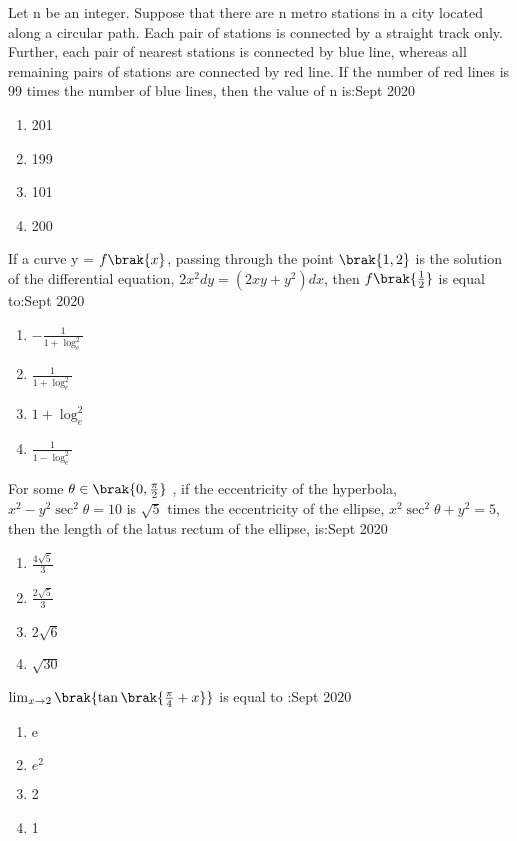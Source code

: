 \iffalse
  \title{Assignment}
  \author{EE24BTECH11038}
  \section{mcq-single}
\fi  
   \item Let n be an integer. Suppose that there are n metro stations in a city located along a circular path. Each pair of stations is connected by a straight track only. Further, each pair of nearest stations is connected by blue line, whereas all remaining pairs of stations are connected by red line. If the number of red lines is 99 times the number of blue lines, then the value of n is:\hfill{Sept 2020}
   \begin{enumerate}
       \item 201
       \item 199
       \item 101
       \item 200
   \end{enumerate}
   \item If a curve y = $f\brak{x}$, passing through the point $\brak{1,2}$ is the solution of the differential equation, $2x^2dy = (2xy+y^2)dx$, then $f\brak{\frac{1}{2}}$ is equal to:\hfill{Sept 2020}
   \begin{enumerate}
       \item $-\frac{1}{1+\log_{e}^{2}}$
       \item $\frac{1}{1+\log_{e}^{2}}$
       \item ${1+\log_{e}^{2}}$
       \item $\frac{1}{1-\log_{e}^{2}}$
   \end{enumerate}
   \item  For some $\theta \in \brak{0,\frac{\pi}{2}}$ , if the eccentricity of the hyperbola, $x^2-y^2\sec ^2 \theta = 10$ is $\sqrt{5}$ times the eccentricity of the ellipse, $x^2 \sec^2 \theta+ y^2 = 5$, then the length of the latus rectum of the ellipse, is:\hfill{Sept 2020}
   \begin{enumerate}
       \item $\frac{4\sqrt{5}}{3}$
       \item $\frac{2\sqrt{5}}{3}$
       \item $2\sqrt{6}$
       \item $\sqrt{30}$
   \end{enumerate}
   \item  $\lim_{x\to 2} \brak{\tan\brak{\frac{\pi}{4}+x}}$ is equal to :\hfill{Sept 2020}
   \begin{enumerate}
       \item e
       \item $e^2$
       \item 2
       \item 1
   \end{enumerate}
